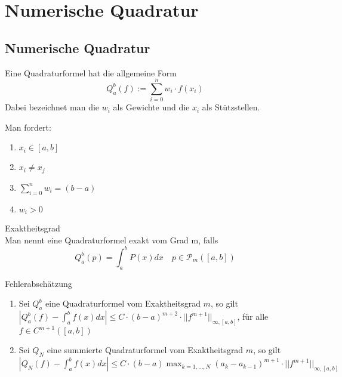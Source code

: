 \section{Numerische Quadratur}

\subsection{Numerische Quadratur}
\begin{definition}[Definition I.1]
Eine Quadraturformel hat die allgemeine Form
\begin{displaymath}
	Q_{a}^{b}(f):=\sum_{i=0}^{n}w_{i}\cdot f(x_{i})
\end{displaymath}
Dabei bezeichnet man die $w_{i}$ als Gewichte und die $x_{i}$ als Stützstellen.
\end{definition}
\begin{remark} Man fordert:
	\begin{enumerate}
		\item $x_{i} \in [a,b]$
		\item $x_{i}\not = x_{j}$
		\item $\sum_{i=0}^{n}w_{i}=(b-a)$
		\item $w_{i} > 0$
	\end{enumerate}
\end{remark}

\begin{definition}
	[Definition I.2] Exaktheitsgrad
	\\
	Man nennt eine Quadraturformel exakt vom Grad m, falls
	\begin{displaymath}
		Q_{a}^{b}(p) = \int_{a}^{b} P(x) dx\quad p\in \mathcal{P}_{m}([a,b])
	\end{displaymath}
\end{definition}

\begin{theorem}
[Satz I.1] Fehlerabschätzung
	\begin{enumerate}
		\item Sei $Q_{a}^{b}$ eine Quadraturformel vom Exaktheitsgrad $m$, so gilt $|Q_{a}^{b}(f)-\int_{a}^{b}f(x) dx|\leq 
		C\cdot (b-a)^{m+2}\cdot ||f^{m+1}||_{\infty,[a,b]}$, für alle $f\in C^{m+1}([a,b])$
		\item Sei $Q_{N}$ eine summierte Quadraturformel vom Exaktheitsgrad $m$, so gilt $|Q_{N}(f)-\int_{a}^{b}f(x)dx|\leq
		C\cdot (b-a)\max_{k=1,\ldots,N}(a_{k}-a_{k-1})^{m+1} \cdot ||f^{m+1}||_{\infty,[a,b]}$
	\end{enumerate}
\end{theorem}

